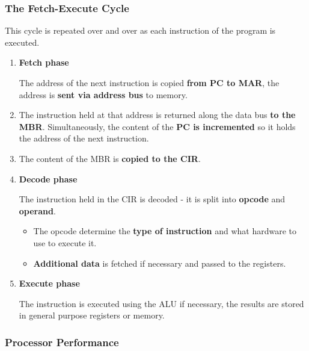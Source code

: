 \subsubsection*{The Fetch-Execute Cycle}

This cycle is repeated over and over as each instruction of the program is executed.
\begin{enumerate}
    \item \textbf{Fetch phase}
        
        The address of the next instruction is copied \textbf{from PC to MAR}, the address is \textbf{sent via address bus} to memory.
    \item The instruction held at that address is returned along the data bus \textbf{to the MBR}. Simultaneously, the content of the \textbf{PC is incremented} so it holds the address of the next instruction.
    \item The content of the MBR is \textbf{copied to the CIR}.

    \item \textbf{Decode phase}
        
        The instruction held in the CIR is decoded - it is split into \textbf{opcode} and \textbf{operand}.
        \begin{itemize}
            \item The opcode determine the \textbf{type of instruction} and what hardware to use to execute it.
            \item \textbf{Additional data} is fetched if necessary and passed to the registers.
        \end{itemize}
    \item \textbf{Execute phase}

        The instruction is executed using the ALU if necessary, the results are stored in general purpose registers or memory.
\end{enumerate}

\subsubsection*{Processor Performance}

